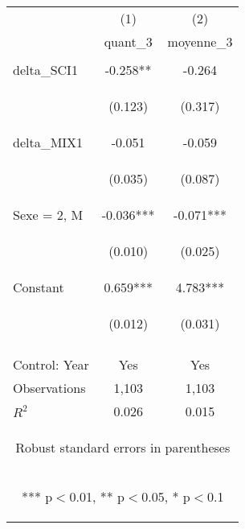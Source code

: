 \begin{center}
\begin{tabular}{lcc} \hline
 & (1) & (2) \\
& quant\_3 & moyenne\_3 \\ \hline
\vspace{4pt} & \begin{footnotesize}\end{footnotesize} & \begin{footnotesize}\end{footnotesize} \\
delta\_SCI1 & -0.258** & -0.264 \\
\vspace{4pt} & \begin{footnotesize}(0.123)\end{footnotesize} & \begin{footnotesize}(0.317)\end{footnotesize} \\
delta\_MIX1 & -0.051 & -0.059 \\
\vspace{4pt} & \begin{footnotesize}(0.035)\end{footnotesize} & \begin{footnotesize}(0.087)\end{footnotesize} \\
Sexe = 2, M & -0.036*** & -0.071*** \\
\vspace{4pt} & \begin{footnotesize}(0.010)\end{footnotesize} & \begin{footnotesize}(0.025)\end{footnotesize} \\
Constant & 0.659*** & 4.783*** \\
 & \begin{footnotesize}(0.012)\end{footnotesize} & \begin{footnotesize}(0.031)\end{footnotesize} \\
\vspace{4pt} & \begin{footnotesize}\end{footnotesize} & \begin{footnotesize}\end{footnotesize} \\
Control: Year & Yes & Yes \\ \hline
Observations & 1,103 & 1,103 \\
 $R^2$ & 0.026 & 0.015 \\ \hline
\multicolumn{3}{c}{\begin{footnotesize} Robust standard errors in parentheses\end{footnotesize}} \\
\multicolumn{3}{c}{\begin{footnotesize} *** p$<$0.01, ** p$<$0.05, * p$<$0.1\end{footnotesize}} \\
\end{tabular}
\end{center}
